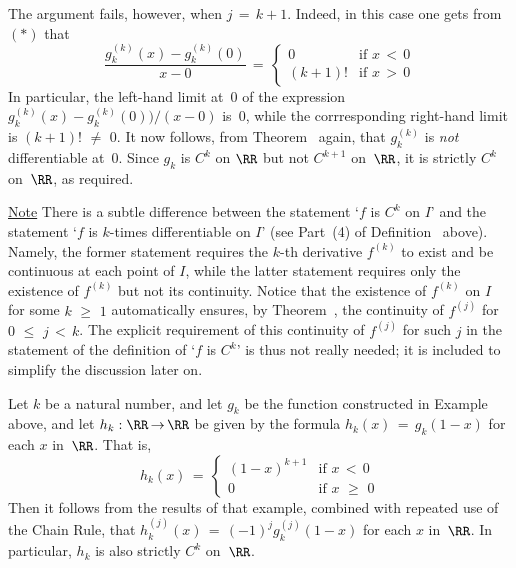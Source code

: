 {        The argument fails, however, when $j \,=\, k+1$. Indeed, in this case one gets from~$({\ast})$ that
        \begin{displaymath}
        \frac{g_{k}^{(k)}(x) - g_{k}^{(k)}(0)}{x-0}
     \,=\, \left\{
        \begin{array}{cl}
        0 & \mbox{if $x\,<\,0$} \\
        (k+1)! & \mbox{if $x\,>\,0$}
        \end{array}
                        \right.
        \end{displaymath}
    In particular, the left-hand limit at~$0$ of the expression $g_{k}^{(k)}(x)-g_{k}^{(k)}(0))/(x-0)$ is~$0$,
    while the corrresponding right-hand limit is $(k+1)! \,\,{\neq}\,\, 0$. It now follows,
    from Theorem~ again, that $g_{k}^{(k)}$ is {\em not} differentiable at~$0$.
    Since $g_{k}$ is $C^{k}$ on ${\RR}$ but not $C^{k+1}$ on~${\RR}$, it is strictly $C^{k}$ on~${\RR}$, as required.

\VV

        \underline{Note} There is a subtle difference between the statement `$f$ is $C^{k}$ on $I$'
    and the statement `$f$ is $k$-times differentiable on $I$' (see Part~(4) of Definition~ above).
    Namely, the former statement requires the $k$-th derivative $f^{(k)}$ to exist and be continuous at each point of $I$,
    while the latter statement requires only the existence of $f^{(k)}$ but not its continuity.
    Notice that the existence of $f^{(k)}$ on $I$ for some $k\,\,{\geq}\,\,1$ automatically ensures, by Theorem~,
    the continuity of $f^{(j)}$ for $0\,\,{\leq}\,\,j\,<\,k$.
    The explicit requirement of this continuity of $f^{(j)}$ for such $j$ in the statement of the definition of `$f$ is $C^{k}$' is thus not really needed;
    it is included to simplify the discussion later on.


        Let $k$ be a natural number, and let $g_{k}$ be the function constructed in Example~ above, and let $h_{k}:{\RR} \,{\rightarrow}\, {\RR}$
    be given by the formula $h_{k}(x) \,=\, g_{k}(1-x)$ for each $x$ in~${\RR}$. That is,
        \begin{displaymath}
        h_{k}(x) \,=\, \left\{
        \begin{array}{ll}
        (1-x)^{k+1} & \mbox{if $x\,<\,0$} \\
          0         & \mbox{if $x\,\,{\geq}\,\,0$}
        \end{array}
                            \right.
        \end{displaymath}
    Then it follows from the results of that example, combined with repeated use of the Chain Rule,
    that $h_{k}^{(j)}(x) \,=\, (-1)^{j}g_{k}^{(j)}(1-x)$ for each $x$ in~${\RR}$. In particular, $h_{k}$ is also strictly $C^{k}$ on~${\RR}$.

}
